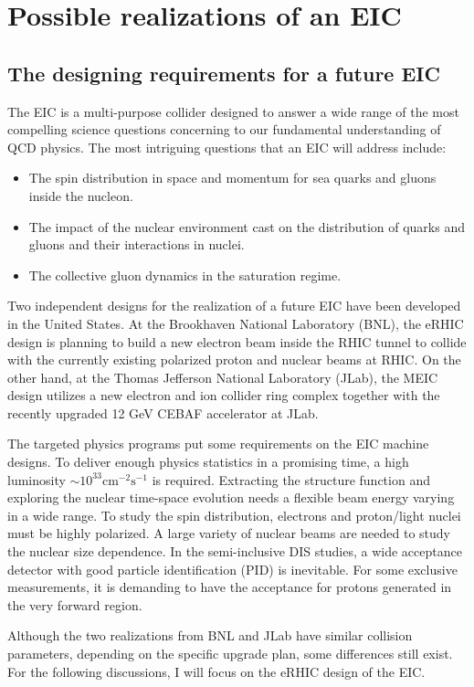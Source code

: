 \chapter{Possible realizations of an EIC} 
\label{chp:EIC}

\section{The designing requirements for a future EIC}
The EIC is a multi-purpose collider designed to answer a wide range
of the most compelling science questions concerning to our fundamental understanding of QCD physics. The most intriguing questions
that an EIC will address include:
\begin{itemize}
\item The spin distribution in space and momentum for sea quarks and gluons inside the nucleon.
\item The impact of the nuclear environment cast on the distribution of quarks and gluons and their interactions in nuclei.
\item The collective gluon dynamics in the saturation regime.
\end{itemize}
Two independent designs for the realization of a future EIC have been developed
in the United States. At the Brookhaven National Laboratory (BNL), the eRHIC
design is planning to build a new electron beam inside the RHIC tunnel to
collide with the currently existing polarized proton and nuclear beams at RHIC.
On the other hand, at the Thomas Jefferson National Laboratory (JLab), the MEIC
design utilizes a new electron and ion collider ring complex together with the
recently upgraded 12 GeV CEBAF accelerator at JLab.

The targeted physics programs put some requirements on the EIC machine designs.
To deliver enough physics statistics in a promising time, a high luminosity
$\sim 10^{33} \mathrm{cm}^{-2}\mathrm{s}^{-1}$ is required. Extracting the
structure function and exploring the nuclear time-space evolution needs a flexible beam
energy varying in a wide range. To study the spin distribution, electrons and proton/light
nuclei must be highly polarized. A large variety of nuclear beams are needed to study
the nuclear size dependence. In the semi-inclusive DIS studies, a wide acceptance
detector with good particle identification (PID) is inevitable. For some exclusive
measurements, it is demanding to have the acceptance for protons generated in the
very forward region.

Although the two realizations from BNL and JLab have similar collision parameters,
depending on the specific upgrade plan, some differences still exist. For the following
discussions, I will focus on the eRHIC design of the EIC. 

